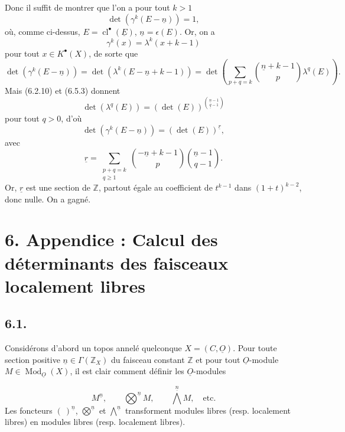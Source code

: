\documentclass{article}
\newcommand{\cl}{\operatorname{cl}}
\newcommand{\Mod}{\operatorname{Mod}}
\begin{document}
Donc il suffit de montrer que l'on a pour tout \(k>1\)
\[
 \det(\gamma^k(E-\underline{n}))=1,
\]
où, comme ci-dessus, \(E=\cl^{\bullet}(\underline E)\), \(\underline{n}=\epsilon(E)\). Or, on a
\[
 \gamma^k(x)=\lambda^k(x+k-1)
\]
pour tout \(x\in K^{\bullet}(X)\), de sorte que
\[
 \det(\gamma^k(E-\underline{n}))
 =
 \det(\lambda^k(E-\underline{n}+k-1))
 =
 \det\left(\sum_{p+q=k}\binom{\underline{n}+k-1}{p}\lambda^q(E)\right).
\]
Mais (6.2.10) et (6.5.3) donnent
\[
 \det(\lambda^q(E))=(\det(E))^{\binom{\underline{n}-1}{\underline{q}-1}}
\]
pour tout \(q>0\), d'où
\[
 \det(\gamma^k(E-\underline{n}))=(\det(E))^{\underline{r}},
\]
avec
\[
 \underline{r}=\sum_{\substack{p+q=k\\ q\geq1}}
 \binom{-\underline{n}+k-1}{p}\binom{\underline{n}-1}{q-1}.
\]
Or, \(\underline{r}\) est une section de \(\mathbb Z\), partout égale au coefficient de \(t^{k-1}\) dans \((1+t)^{k-2}\), donc nulle. On a gagné.

\section*{6. Appendice : Calcul des déterminants des faisceaux localement libres}

\subsection*{6.1.}
Considérons d'abord un topos annelé quelconque \(X=({C},\underline{O})\). Pour toute section positive \(\underline{n}\in\Gamma(\mathbb Z_X)\) du faisceau constant \(\mathbb Z\) et pour tout \(\underline{O}\)-module \(M\in\Mod_{\underline{O}}(X)\), il est clair comment définir les \(\underline{O}\)-modules

\clearpage
\begin{equation}\tag{6.1.1}
 M^{\underline{n}},\qquad \bigotimes^{\underline{n}} M,\qquad \bigwedge^{\underline{n}} M,\quad\text{etc.}
\end{equation}
Les
foncteurs \((\ )^{\underline{n}}\), \(\bigotimes\limits^{\underline{n}}\) et \(\bigwedge\limits^{\underline{n}}\) transforment modules libres (resp. localement libres) en modules libres (resp. localement libres).
\end{document}
